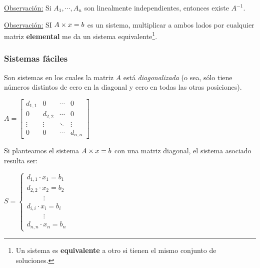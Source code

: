 \documentclass[]{article}
\begin{document}
\underline{Observación:} Si $A_1,\cdots,A_n$ son linealmente independientes, entonces existe $A^{-1}$.


\underline{Observación:} SI $A\times x = b$ es un sistema, multiplicar a ambos lados por cualquier matriz \textbf{elemental} me da un sistema equivalente\footnote{Un sistema es \textbf{equivalente} a otro si tienen el mismo conjunto de soluciones.}.

\subsubsection{Sistemas fáciles}
Son sistemas en los cuales la matriz $A$ está \emph{diagonalizada} (o sea, sólo tiene números distintos de cero en la diagonal y cero en todas las otras posiciones).

\begin{center}
	$A=\begin{bmatrix}
		d_{1,1}&0&\cdots&0\\
		0&d_{2,2}&\cdots&0\\
		\vdots&\vdots&\ddots&\vdots\\
		0&0&\cdots&d_{n,n}
	\end{bmatrix}$
\end{center}


Si planteamos el sistema $A\times x = b$ con una matriz diagonal, el sistema asociado resulta ser:

\begin{center}
	$S=\begin{cases}
	d_{1,1}\cdot x_1 = b_1\\
	d_{2,2}\cdot x_2 = b_2\\
	\hspace{1cm}\vdots \\
	d_{i,i}\cdot x_i = b_i\\
	\hspace{1cm}\vdots \\
	d_{n,n}\cdot x_n = b_n
	\end{cases}$
\end{center}
\end{document}
